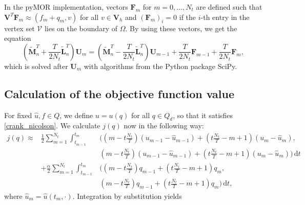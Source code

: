 In the pyMOR implementation, vectors $\mathbf{F}_m$ for $m=0,\dotsc,N_t$ are defined such that $\mathbf{V}^T\mathbf{F}_m\approx(f_m + q_m, v)$ for all $v\in \mathbf{V}_h$ and $\left(\mathbf{F}_m\right)_i=0$ if the $i$-th entry in the vertex set $\mathcal{V}$ lies on the boundary of $\Omega$. By using these vectors, we get the equation
\begin{equation}
\label{crank_nicolson}
\left(\tilde{\mathbf{M}}_n^T + \frac{T}{2N_t} \tilde{\mathbf{L}}_n^T\right) \mathbf{U}_m = \left(\tilde{\mathbf{M}}_n^T - \frac{T}{2N_t} \tilde{\mathbf{L}}_n^T\right) \mathbf{U}_{m-1} + \frac{T}{2N_t} \mathbf{F}_{m-1} + \frac{T}{2N_t} \mathbf{F}_m,
\end{equation}
which is solved after $\mathbf{U}_m$ with algorithms from the Python package SciPy.

\subsection{\label{subsectionCalculationOfTheObjectiveFunctionValue}Calculation of the objective function value}
For fixed $\hat{u},f\in Q$, we define $u=u(q)$ for all $q\in Q_d$, so that it satisfies \eqref{crank_nicolson}. We calculate $j(q)$ now in the following way:
\begin{eqnarray*}
j(q) \approx& \frac{1}{2}\sum_{m=1}^{N_t}\int_{t_{m-1}}^{t_m}&\bigg(\left(m-t\frac{N_t}{T}\right) \left(u_{m-1}-\hat{u}_{m-1}\right)+\left(t\frac{N_t}{T}-m+1\right) \left(u_{m}-\hat{u}_{m}\right),\\
&&\left(m-t\frac{N_t}{T}\right) \left(u_{m-1}-\hat{u}_{m-1}\right)+\left(t\frac{N_t}{T}-m+1\right) \left(u_{m}-\hat{u}_{m}\right)\bigg)\,\mathrm{d}t\\
&+ \frac{\alpha}{2}\sum_{m=1}^{N_t}\int_{t_{m-1}}^{t_m}&\bigg(\left(m-t\frac{N_t}{T}\right) q_{m-1}+\left(t\frac{N_t}{T}-m+1\right) q_{m},\\
&&\left(m-t\frac{N_t}{T}\right) q_{m-1}+\left(t\frac{N_t}{T}-m+1\right) q_{m}\bigg)\,\mathrm{d}t,
\end{eqnarray*}
where $\hat{u}_m=\hat{u}(t_m, \cdot)$. Integration by substitution yields
